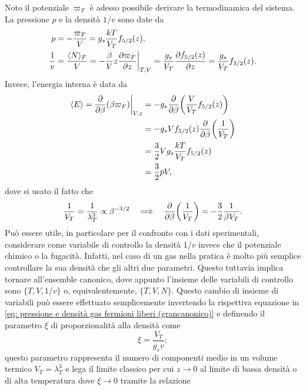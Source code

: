 Noto il potenziale $\varpi_F$ è adesso possibile derivare la termodinamica del sistema. La pressione $p$ e la densità $1/v$ sono date da
\begin{align}
\label{eq: pressione e densità gas fermioni liberi (grancanonico)}
    p &= -\frac{\varpi_F}{V} = g_s\frac{kT}{V_T}f_{5/2}(z), \\
    \frac{1}{v} &= \frac{\langle N \rangle_F}{V} = -\frac{\beta}{V}z\frac{\partial\varpi_F}{\partial z}\bigg|_{T,V} = \frac{g_s}{V_T}\frac{\partial f_{5/2}(z)}{\partial z} = \frac{g_s}{V_T}f_{3/2}(z).
\end{align}
Invece, l'energia interna è data da
\begin{equation}
    \begin{split}
        \langle E \rangle = \frac{\partial}{\partial\beta}(\beta\varpi_F)\bigg|_{V,z} &= -g_s\frac{\partial}{\partial\beta}\bigg(\frac{V}{V_T}f_{5/2}(z)\bigg) \\
        &= -g_sVf_{5/2}(z)\frac{\partial}{\partial\beta}\bigg(\frac{1}{V_T}\bigg) \\
        &= \frac{3}{2}Vg_s\frac{kT}{V_T}f_{5/2}(z) \\
        &=\frac{3}{2}pV,
    \end{split}
\end{equation}
dove si usato il fatto che
\begin{equation}
    \frac{1}{V_T} = \frac{1}{\lambda_T^3} \propto \beta^{-3/2}\quad\Longrightarrow\quad \frac{\partial}{\partial\beta}\bigg(\frac{1}{V_T}\bigg) = -\frac{3}{2}\frac{1}{\beta V_T}.
\end{equation}
Può essere utile, in particolare per il confronto con i dati sperimentali, considerare come variabile di controllo la densità $1/v$ invece che il potenziale chimico o la fugacità. Infatti, nel caso di un gas nella pratica è molto più semplice controllare la sua densità che gli altri due parametri. Questo tuttavia implica tornare all'ensemble canonico, dove appunto l'insieme delle variabili di controllo sono $\{T,V,1/v\}$ o, equivalentemente, $\{T,V,N\}$. Questo cambio di insieme di variabili può essere effettuato semplicemente invertendo la rispettiva equazione in \eqref{eq: pressione e densità gas fermioni liberi (grancanonico)} e definendo il parametro $\xi$ di proporzionalità alla densità come
\begin{equation}
\label{eq: parametro fermionico}
    \xi = \frac{V_T}{g_sv};
\end{equation}
questo parametro rappresenta il numero di componenti medio in un volume termico $V_T = \lambda_T^3$ e lega il limite classico per cui $z \to 0$ al limite di bassa densità o di alta temperatura dove $\xi \to 0$ tramite la relazione
